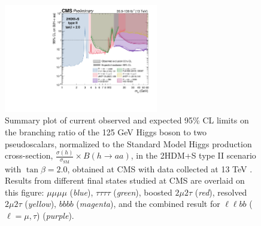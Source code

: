   \begin{figure}[h]
    \begin{center}
      \includegraphics[width=0.6\textwidth]{figures/ch-10-results/summary_plot_full_run2_plot_BRaa_Type2_tanbeta2.pdf}
    \end{center}
    \caption[Summary plot of current observed and expected 95\% CL limits on the branching ratio of the 125 GeV Higgs boson to two pseudoscalars, normalized to the Standard Model Higgs production cross-section, $\frac{\sigma(h)}{\sigma_{\text{SM}}} \times B(h \rightarrow aa)$, in the 2HDM+S type II scenario with $\tan\beta = 2.0$, obtained at CMS with data collected at 13 TeV.]{Summary plot of current observed and expected 95\% CL limits on the branching ratio of the 125 GeV Higgs boson to two pseudoscalars, normalized to the Standard Model Higgs production cross-section, $\frac{\sigma(h)}{\sigma_{\text{SM}}} \times B(h \rightarrow aa)$, in the 2HDM+S type II scenario with $\tan\beta = 2.0$, obtained at CMS with data collected at 13 TeV \cite{twiki_2HDM+S_summary-plots}. Results from different final states studied at CMS are overlaid on this figure: $\mu\mu\mu\mu$ (\textit{blue}), $\tau\tau\tau\tau$ (\textit{green}), boosted $2\mu 2\tau$ (\textit{red}), resolved $2\mu 2\tau$ (\textit{yellow}), $bbbb$ (\textit{magenta}), and the combined result for $\ell\ell bb$ ($\ell = \mu, \tau$) (\textit{purple}).}
      \label{fig:summary_plot_typeII_tan_beta_2p0}
  \end{figure}
